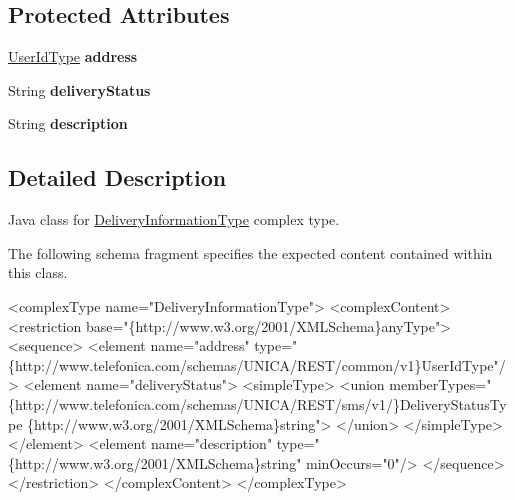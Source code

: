 \subsection*{Protected Attributes}
\begin{DoxyCompactItemize}
\item 
\hypertarget{classcom_1_1telefonica_1_1schemas_1_1unica_1_1rest_1_1sms_1_1v1_1_1DeliveryInformationType_a36b9c78126e3051091fdee7a0166bd87}{
\hyperlink{classcom_1_1telefonica_1_1schemas_1_1unica_1_1rest_1_1common_1_1v1_1_1UserIdType}{UserIdType} {\bfseries address}}
\label{classcom_1_1telefonica_1_1schemas_1_1unica_1_1rest_1_1sms_1_1v1_1_1DeliveryInformationType_a36b9c78126e3051091fdee7a0166bd87}

\item 
\hypertarget{classcom_1_1telefonica_1_1schemas_1_1unica_1_1rest_1_1sms_1_1v1_1_1DeliveryInformationType_af929dec8fb7b2e4f28e4e7cce3b4b565}{
String {\bfseries deliveryStatus}}
\label{classcom_1_1telefonica_1_1schemas_1_1unica_1_1rest_1_1sms_1_1v1_1_1DeliveryInformationType_af929dec8fb7b2e4f28e4e7cce3b4b565}

\item 
\hypertarget{classcom_1_1telefonica_1_1schemas_1_1unica_1_1rest_1_1sms_1_1v1_1_1DeliveryInformationType_aefc1aab09e3d8302ba79e6b4b0cc8e2b}{
String {\bfseries description}}
\label{classcom_1_1telefonica_1_1schemas_1_1unica_1_1rest_1_1sms_1_1v1_1_1DeliveryInformationType_aefc1aab09e3d8302ba79e6b4b0cc8e2b}

\end{DoxyCompactItemize}


\subsection{Detailed Description}
Java class for \hyperlink{classcom_1_1telefonica_1_1schemas_1_1unica_1_1rest_1_1sms_1_1v1_1_1DeliveryInformationType}{DeliveryInformationType} complex type.

The following schema fragment specifies the expected content contained within this class.


\begin{DoxyPre}
 <complexType name="DeliveryInformationType">
   <complexContent>
     <restriction base="\{http://www.w3.org/2001/XMLSchema\}anyType">
       <sequence>
         <element name="address" type="\{http://www.telefonica.com/schemas/UNICA/REST/common/v1\}UserIdType"/>
         <element name="deliveryStatus">
           <simpleType>
             <union memberTypes=" \{http://www.telefonica.com/schemas/UNICA/REST/sms/v1/\}DeliveryStatusType \{http://www.w3.org/2001/XMLSchema\}string">
             </union>
           </simpleType>
         </element>
         <element name="description" type="\{http://www.w3.org/2001/XMLSchema\}string" minOccurs="0"/>
       </sequence>
     </restriction>
   </complexContent>
 </complexType>
 \end{DoxyPre}
 

